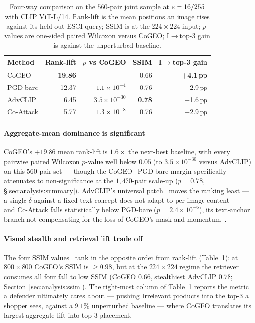 \begin{table}[tb]
\centering
\caption{Four-way comparison on the $560$-pair joint sample at $\varepsilon = 16/255$ with CLIP ViT-L/14. Rank-lift is the mean positions an image rises against its held-out ESCI query; SSIM is at the $224 \times 224$ input; $p$-values are one-sided paired Wilcoxon versus CoGEO; I$\to$top-3 gain is against the unperturbed baseline.}
\label{tab:main4way}
\small
\begin{tabular}{lrrrr}
\toprule
Method     & Rank-lift & $p$ vs CoGEO & SSIM  & I$\to$top-3 gain \\
\midrule
CoGEO      & \textbf{19.86} & ---            & 0.66  & \textbf{+4.1\,pp} \\
PGD-bare   & 12.37          & $1.1 \times 10^{-4}$ & 0.76  & +2.9\,pp \\
AdvCLIP    & ~6.45          & $3.5 \times 10^{-30}$ & \textbf{0.78} & +1.6\,pp \\
Co-Attack  & ~5.77          & $1.3 \times 10^{-8}$  & 0.76  & +2.9\,pp \\
\bottomrule
\end{tabular}
\end{table}

\paragraph{Aggregate-mean dominance is significant} CoGEO's $+19.86$ mean rank-lift is $1.6\times$ the next-best baseline, with every pairwise paired Wilcoxon $p$-value well below $0.05$ (to $3.5 \times 10^{-30}$ versus AdvCLIP) on this $560$-pair set --- though the CoGEO$-$PGD-bare margin specifically attenuates to non-significance at the $1{,}430$-pair scale-up ($p{=}0.78$, \S\ref{sec:analysis:summary}). AdvCLIP's universal patch~\cite{zhou2023advclip} moves the ranking least --- a single $\delta$ against a fixed text concept does not adapt to per-image content~\cite{moosavidezfooli2017uap} --- and Co-Attack falls statistically below PGD-bare ($p = 2.4 \times 10^{-6}$), its text-anchor branch not compensating for the loss of CoGEO's mask and momentum~\cite{dong2018mifgsm,xie2019dim,lin2020sim}.

\paragraph{Visual stealth and retrieval lift trade off} The four SSIM values~\cite{wang2004ssim} rank in the opposite order from rank-lift (Table~\ref{tab:main4way}): at $800 \times 800$ CoGEO's $\mathrm{SSIM}$ is $\geq 0.98$, but at the $224 \times 224$ regime the retriever consumes all four fall to low SSIM (CoGEO $0.66$, stealthiest AdvCLIP $0.78$; Section~\ref{sec:analysis:ssim}). The right-most column of Table~\ref{tab:main4way} reports the metric a defender ultimately cares about --- pushing Irrelevant products into the top-3 a shopper sees, against a $9.1\%$ unperturbed baseline --- where CoGEO translates its largest aggregate lift into top-3 placement.
